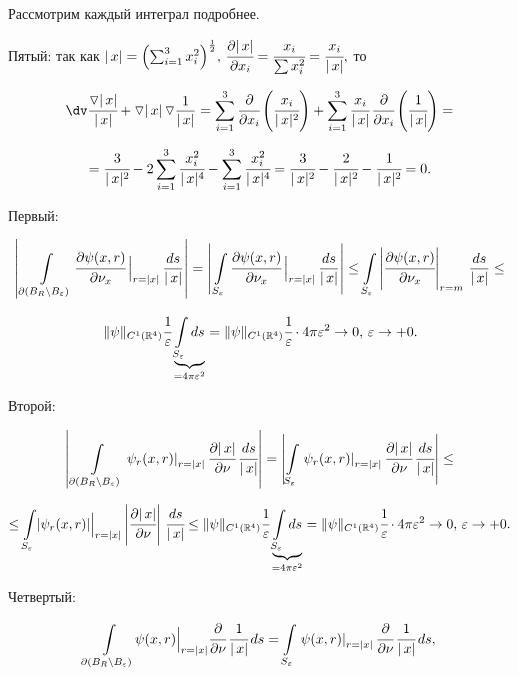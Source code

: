 \documentclass[unicode,12pt,draft]{article}
\begin{document}
Рассмотрим каждый интеграл подробнее.

Пятый: так как
$|\,x|=\Bigl(\sum_{i=1}^3x_i^2\Bigr)^{\frac12},\,\cfrac{\partial|\,x|}{\partial
x_i}=\cfrac {x_i}{\sum x_i^2}=\cfrac {x_i}{|\,x|},$ то

$$\dv
\cfrac{\triangledown |\,x|}{|\,x|} +\triangledown|\,x|\,
\triangledown\frac1{|\,x|}=\sum_{i=1}^3\cfrac{\partial}{\partial
x_i}\left(\cfrac {x_i}{|\,x|^2}\right)+ \sum_{i=1}^3\cfrac
{x_i}{|\,x|}\,\cfrac{\partial}{\partial
x_i}\left(\cfrac1{|\,x|}\right)=$$

$$=\cfrac 3{|\,x|^2}-2\sum_{i=1}^3\cfrac{x_i^2}{|\,x|^4}-\sum_{i=1}^3\cfrac{x_i^2}{|\,x|^4}=
\cfrac 3{|\,x|^2}-\cfrac 2{|\,x|^2}-\cfrac 1{|\,x|^2}=0.$$

Первый:

$$\left|\,\Bigl.\int\limits_{\partial(B_R\setminus B_{\varepsilon})}
\cfrac{\partial\psi(x,r)}{\partial
\nu_x}\,\Bigr|_{r=|x|}\,\frac{ds}{|\,x|}\right|=
\left|\,\Bigl.\int\limits_{S_{\varepsilon}}
\cfrac{\partial\psi(x,r)}{\partial
\nu_x}\,\Bigr|_{r=|x|}\,\frac{ds}{|\,x|}\right|\le
\int\limits_{S_{\varepsilon}}\left|\cfrac{\partial\psi(x,r)}{\partial
\nu_x}\right|_{r=m}\,\frac{ds}{|\,x|}\le$$

$$\|\psi\|_{C^1(\mathbb R^4)}\cfrac1{\varepsilon}
\underbrace{\int\limits_{S_{\varepsilon}}ds}_{=4\pi\varepsilon^2}=
\|\psi\|_{C^1(\mathbb
R^4)}\cfrac1{\varepsilon}\cdot4\pi\varepsilon^2\to0,\,\varepsilon\to+0.$$

Второй:

$$\left|\,\int\limits_{\partial(B_R\setminus B_{\varepsilon})}
\left.\psi_r(x,r)\right|_{r=|x|}\cfrac{\partial |\,x|}{\partial
\nu}\,\cfrac{ds}{|\,x|}\right|=
\left|\int\limits_{S_{\varepsilon}}\left.\psi_r(x,r)\right|_{r=|x|}\cfrac{\partial
|\,x|}{\partial \nu}\,\cfrac{ds}{|\,x|}\right|\le$$

$$\le\int\limits_{S_{\varepsilon}}\Bigl.|\psi_r(x,r)|\Bigr|_{r=|x|}\left|\cfrac{\partial
|\,x|}{\partial \nu}\right|\,\cfrac{ds}{|\,x|}\le
\|\psi\|_{C^1(\mathbb R^4)}\cfrac1{\varepsilon}
\underbrace{\int\limits_{S_{\varepsilon}}ds}_{=4\pi\varepsilon^2}=
\|\psi\|_{C^1(\mathbb
R^4)}\cfrac1{\varepsilon}\cdot4\pi\varepsilon^2\to0,\,\varepsilon\to+0.$$

Четвертый:

$$\int\limits_{\partial(B_R\setminus B_{\varepsilon})}
\Bigl.\psi(x,r)\Bigr|_{r=|x|}\cfrac{\partial }{\partial
\nu}\,\cfrac1{|\,x|}\,ds=
\int\limits_{S_{\varepsilon}}\left.\psi(x,r)\right|_{r=|x|}\cfrac{\partial}{\partial
\nu}\,\cfrac1{|\,x|}\,ds,$$
\end{document}
